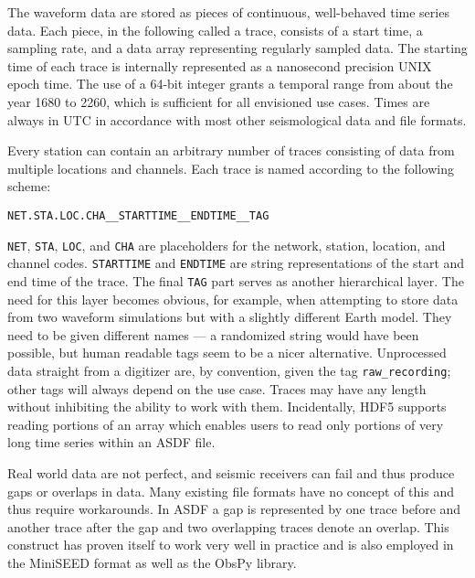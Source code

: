 The waveform data are stored as pieces of continuous, well-behaved time series
data. Each piece, in the following called a trace, consists of a start time, a
sampling rate, and a data array representing regularly sampled data.  The
starting time of each trace is internally represented as a nanosecond precision
UNIX epoch time. The use of a 64-bit integer grants a temporal range from about
the year 1680 to 2260, which is sufficient for all envisioned use cases.  Times
are always in UTC in accordance with most other seismological data and file
formats.

Every station can contain an arbitrary number of traces consisting of data from
multiple locations and channels. Each trace is named according to the following
scheme:

\vspace{2ex}

\texttt{NET.STA.LOC.CHA\_\_STARTTIME\_\_ENDTIME\_\_TAG}

\vspace{2ex}

\texttt{NET}, \texttt{STA}, \texttt{LOC}, and \texttt{CHA} are placeholders for
the network, station, location, and channel codes. \texttt{STARTTIME} and
\texttt{ENDTIME} are string representations of the start and end time of the
trace. The final \texttt{TAG} part serves as another hierarchical layer. The
need for this layer becomes obvious, for example, when attempting to store data
from two waveform simulations but with a slightly different Earth model. They
need to be given different names --- a randomized string would have been
possible, but human readable tags seem to be a nicer alternative. Unprocessed
data straight from a digitizer are, by convention, given the tag
\texttt{raw\_recording}; other tags will always depend on the use case.
Traces may have any length without inhibiting the ability to work with them.
Incidentally, HDF5 supports reading portions of an array which enables users to
read only portions of very long time series within an ASDF file.

Real world data are not perfect, and seismic receivers can fail and thus produce
gaps or overlaps in data. Many existing file formats have no concept of this
and thus require workarounds. In ASDF a gap is represented by one trace before
and another trace after the gap and two overlapping traces denote an overlap.
This construct has proven itself to work very well in practice and is also
employed in the MiniSEED format as well as the ObsPy library.

